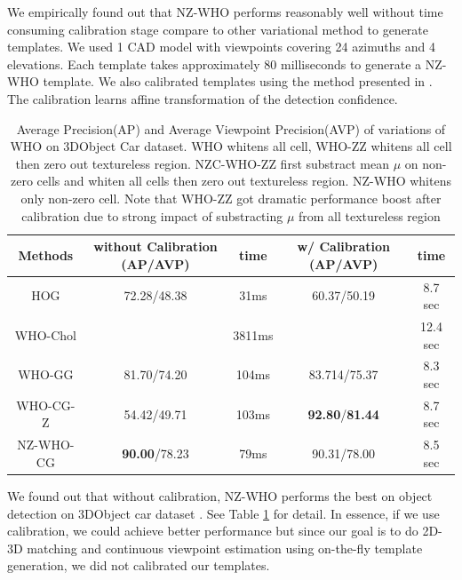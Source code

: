 \documentclass[10pt,twocolumn,letterpaper]{article}
\begin{document}
We empirically found out that NZ-WHO performs reasonably well without time consuming calibration stage compare to other variational method to generate templates. We used 1 CAD model with viewpoints covering 24 azimuths and 4 elevations. Each template takes approximately 80 milliseconds to generate a NZ-WHO template. We also calibrated templates using the method presented in \cite{Aubry14}. The calibration learns affine transformation of the detection confidence.%


\begin{table}[!htbp]
    \begin{center}
\begin{tabular}{|c|c|c|c|c|}
\hline
Methods &  without Calibration (AP/AVP) & time & w/ Calibration \cite{Aubry14} (AP/AVP) & time \\
\hline\hline
HOG\cite{Dalal05}     & 72.28/48.38  &  31ms  & 60.37/50.19               &   8.7 sec \\ 
WHO-Chol\cite{Hariharan12} &              &3811ms    &                           &   12.4 sec  \\
WHO-GG                & 81.70/74.20  &104ms &     83.714/75.37              &   8.3 sec \\
WHO-CG-Z              & 54.42/49.71  &103ms & \textbf{92.80}/\textbf{81.44} &   8.7 sec  \\
NZ-WHO-CG        & \textbf{90.00}/78.23 & 79ms & 90.31/78.00                   &  8.5 sec   \\
\hline
\end{tabular}
\end{center}
\caption{Average Precision(AP) and Average Viewpoint Precision(AVP) \cite{Xiang14} of variations of WHO on 3DObject Car dataset\cite{Savarese07}. WHO\cite{Hariharan12} whitens all cell, WHO-ZZ whitens all cell then zero out textureless region. NZC-WHO-ZZ first substract mean $\mu$ on non-zero cells and whiten all cells then zero out textureless region. NZ-WHO whitens only non-zero cell. Note that WHO-ZZ got dramatic performance boost after calibration due to strong impact of substracting $\mu$ from all textureless region}
\label{tab:who_initializations}
\end{table}

We found out that without calibration, NZ-WHO performs the best on object detection on 3DObject car dataset \cite{Savarese07}. See Table \ref{tab:who_initializations} for detail. In essence, if we use calibration, we could achieve better performance but since our goal is to do 2D-3D matching and continuous viewpoint estimation using on-the-fly template generation, we did not calibrated our templates.
\end{document}
